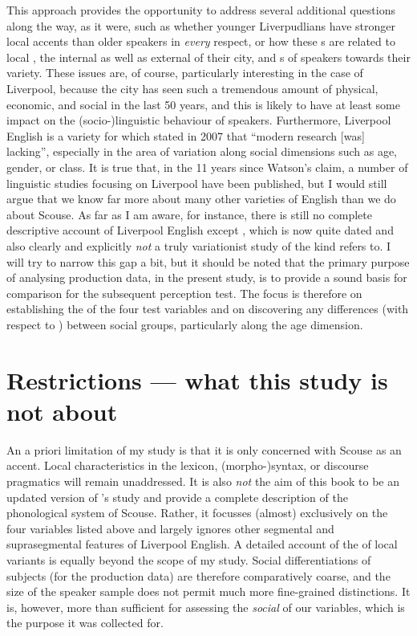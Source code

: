 This approach provides the opportunity to address several additional questions along the way, as it were, such as whether younger Liverpudlians have stronger local accents than older speakers in \emph{every} respect, or how these s are related to local , the internal as well as external  of their city, and s of speakers towards their variety.
These issues are, of course, particularly interesting in the case of Liverpool, because the city has seen such a tremendous amount of physical, economic, and social  in the last 50 years, and this is likely to have at least some impact on the (socio-)linguistic behaviour of speakers.
Furthermore, Liverpool English is a variety for which \textcite[351]{watson2007} stated in 2007 that ``modern research [was] lacking'', especially in the area of variation along social dimensions such as age, gender, or class.
It is true that, in the 11 years since Watson's claim, a number of linguistic studies focusing on Liverpool have been published, but I would still argue that we know far more about many other varieties of English than we do about Scouse.
As far as I am aware, for instance, there is still no complete descriptive account of Liverpool English except \cite{knowles1973}, which is now quite dated and also clearly and explicitly \emph{not} a truly variationist study of the kind \textcite{watson2007} refers to.
I will try to narrow this gap a bit, but it should be noted that the primary purpose of analysing production data, in the present study, is to provide a sound basis for comparison for the subsequent perception test.
The focus is therefore on establishing the  of the four test variables and on discovering any differences (with respect to ) between social groups, particularly along the age dimension.

\section{Restrictions --- what this study is not about}
\label{sec.intro.restrict}

An a priori limitation of my study is that it is only concerned with Scouse as an accent.
Local characteristics in the lexicon, (morpho-)syntax, or discourse pragmatics will remain unaddressed.
It is also \emph{not} the aim of this book to be an updated version of \citeauthor{knowles1973}'s \citeyear{knowles1973} study and provide a complete description of the phonological system of Scouse.
Rather, it focusses (almost) exclusively on the four variables listed above and largely ignores other segmental and suprasegmental features of Liverpool English.
A detailed account of the  of local variants is equally beyond the scope of my study.
Social differentiations of subjects (for the production data) are therefore comparatively coarse, and the size of the speaker sample does not permit much more fine-grained distinctions.
It is, however, more than sufficient for assessing the \emph{social } of our variables, which is the purpose it was collected for.

